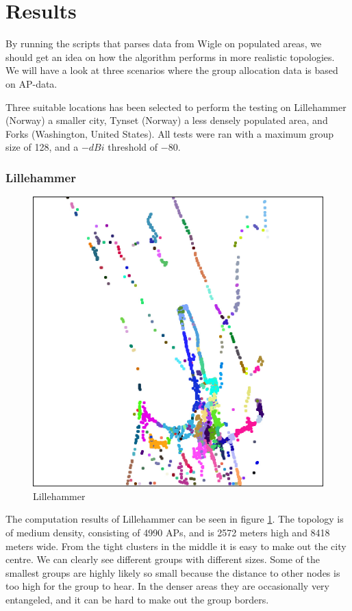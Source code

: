 \section{Results}
By running the scripts that parses data from Wigle on populated areas, we should get an idea 
on how the algorithm performs in more realistic topologies. We will have a look at three
scenarios where the group allocation data is based on AP-data. 

Three suitable locations has been selected to perform the testing on Lillehammer (Norway)
a smaller city, Tynset (Norway) a less densely populated area, 
and Forks (Washington, United States). All tests were 
ran with a maximum group size of 128, and a $-dBi$ threshold of $-80$. 

\subsubsection{Lillehammer}
\begin{figure}
\center
\includegraphics[scale=0.46]{Images/cities/lillehammer_groups.jpg}
\caption{Lillehammer}
\label{fig:lillehammer_topo}
\end{figure}

The computation results of Lillehammer can be seen in figure \ref{fig:lillehammer_topo}.
The topology is of medium density, consisting of 4990 APs, and is 2572 meters high 
and 8418 meters wide. From the tight clusters in the middle it is easy to make out the city centre.
We can clearly see different groups with different sizes. Some of the smallest groups
are highly likely so small because the distance to other nodes is too high for
the group to hear. In the denser areas they are occasionally very
entangeled, and it can be hard to make out the group borders.

